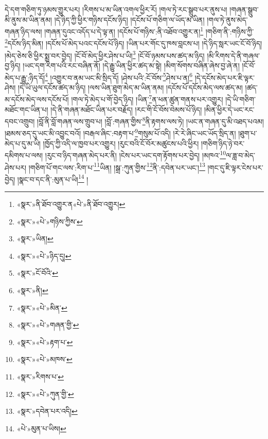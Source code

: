དེ་དག་གཅིག་ཏུ་ཉམས་གྱུར་པར། །རིགས་པ་མ་ཡིན་འགལ་ཕྱིར་རོ། །གལ་ཏེ་རང་སྒྲུབ་པར་ནུས་པ། །གཞན་སྒྲུབ་མི་ནུས་མ་ཡིན་ནམ། །དེ་ཉིད་ཀྱི་ཕྱིར་གཉིས་དངོས་ཉིད། །དངོས་པོ་གཅིག་ལ་ཡོད་མ་ཡིན། །གལ་ཏེ་ནུས་མེད་གཞན་ཉིད་ལས། །གཞན་དུའང་འདོད་པ་དེ་ལྟ་ན། །དངོས་པོ་གཉིས་:ནི་འཐོབ་འགྱུར་ན།\footnote{«སྣར་»ནི་ཐོབ་འགྱུར་ན«པེ་»ནི་ཐོབ་འགྱུར།} །གཅིག་ནི་:གཉིས་ཀྱི་\footnote{«སྣར་»«པེ་»གཉིས་ཀྱིས་}དངོས་ཉིད་མིན། །དངོས་པོ་མེད་པའང་དངོས་པོ་ཉིད། །ཡིན་པར་གོང་དུ་ཁས་བླངས་པ། །དེ་ཉིད་སླར་ཡང་ངོ་བོ་ཉིད། །མེད་ཅེས་ཅི་ཕྱིར་སྨྲ་བར་བྱེད། །ངོ་བོ་མེད་ཕྱིར་ཤེས་པ་ཡི།\footnote{«སྣར་»ཡིན།} །ངོ་བོ་ཉམས་པས་ཚད་མ་ཉིད། །མི་རིགས་དེ་ནི་གཞལ་བྱ་ཉིད། །ཡང་དག་རིག་པའི་རང་བཞིན་ནོ། །དེ་རྒྱུ་ཡིན་ཕྱིར་ཚད་མ་སྟེ། །མིག་སོགས་བཞིན་ཞེས་བྱ་ཞེ་ན། །ངོ་བོ་མེད་པ་རྒྱུ་:ཉིད་དོ།\footnote{«སྣར་»«པེ་»ཉིད་དུ།} །འགྱུར་བ་ནམ་ཡང་མི་སྲིད་དོ། །ཤེས་པའི་:ངོ་བོས་\footnote{«སྣར་»ངོ་བོའི་}ཤེས་པ་ན།\footnote{«སྣར་»ནི།} །དེ་དངོས་མེད་པར་ཇི་ལྟར་ཤེས། །དེ་ཡི་ཡུལ་དངོས་ཚད་མ་ཉིད། །ལས་ཡིན་ཐུག་མེད་མ་ཡིན་ནམ། །དངོས་པོ་དངོས་མེད་ལས་ཚད་མ། །ཚད་མ་དངོས་མེད་ལས་དངོས་པོ། །གལ་ཏེ་མེད་པ་གོ་བྱེད་ཉིད། །ཡིན་\footnote{«སྣར་»«པེ་»མིན་}ན་ཕན་ཚུན་གནས་པར་འགྱུར། །དེ་ཡི་གཅིག་མཐོང་གང་ཡིན་པ། །དེ་ནི་གཞན་མཐོང་ཡིན་པར་བརྗོད། །རང་གི་ངོ་བོས་བེམས་པོ་ཉིད། །མིན་ཕྱིར་དེ་ཡང་རང་དབང་འགྲུབ། །བློ་ནི་བློ་གཞན་ལས་གྲུབ་པ། །བློ་:གཞན་གྱིས་\footnote{«སྣར་»«པེ་»གཞན་གྱི་}ནི་རྟགས་ལས་ཏེ། །ཡང་ན་གཞན་དུ་མི་འཐད་པའམ། །ཐམས་ཅད་དུ་ཡང་མི་འབྱུང་བའོ། །བརྒལ་ཞིང་:བརྟག་པ་\footnote{«སྣར་»«པེ་»རྟག་པ་}གསུམ་པོ་འདི། །རེ་རེ་ཞིང་ཡང་ཡོད་སྲིད་ན། །ཐུག་པ་མེད་པ་དུ་མ་ཡི། །ཁྱོད་ཀྱི་འདི་ལ་ཁྱབ་པར་འགྱུར། །རུང་བའི་ངོ་བོར་མཚུངས་པའི་ཕྱིར། །གཅིག་ཉིད་ཉེ་བར་དམིགས་པ་ལས། །རུང་བ་ཉིད་གཞན་མེད་པར་ནི། །ངེས་པར་ཡང་དག་རྟོགས་པར་བྱེད། །མཁའ་\footnote{«སྣར་»«པེ་»མཁས་}ལ་ཟླ་བ་མེད་ཤེས་པར། །གཅིག་པོ་གང་ལས་:རིག་པ་\footnote{«སྣར་»རིགས་པ་}ཡིན། །སྒྲ་:ཀུན་གྱིས་\footnote{«སྣར་»«པེ་»ཀུན་གྱི་}ནི་:དབེན་པར་ཡང་།\footnote{«སྣར་»དབེན་པར་འདི།} །གང་དུ་ཇི་ལྟར་ངེས་པར་བྱེད། །སྣང་བ་དང་ནི་:མུན་པ་ཡི།\footnote{«པེ་»མུན་པ་ཡིས།} །
